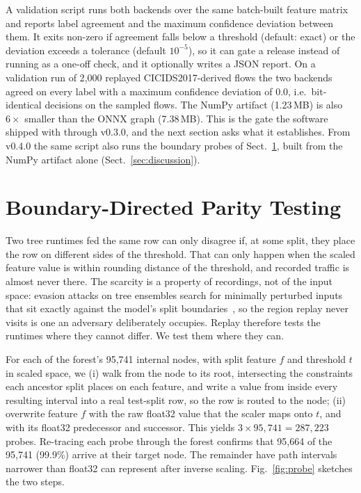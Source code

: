 \documentclass[runningheads]{llncs}
\begin{document}
A validation script runs both backends over the same batch-built feature matrix and reports label agreement and the maximum confidence deviation between them. It exits non-zero if agreement falls below a threshold (default: exact) or the deviation exceeds a tolerance (default $10^{-5}$), so it can gate a release instead of running as a one-off check, and it optionally writes a JSON report. On a validation run of 2{,}000 replayed CICIDS2017-derived flows the two backends agreed on every label with a maximum confidence deviation of 0.0, i.e.\ bit-identical decisions on the sampled flows. The NumPy artifact (1.23\,MB) is also $6\times$ smaller than the ONNX graph (7.38\,MB). This is the gate the software shipped with through v0.3.0, and the next section asks what it establishes. From v0.4.0 the same script also runs the boundary probes of Sect.~\ref{sec:boundary}, built from the NumPy artifact alone (Sect.~\ref{sec:discussion}).

\section{Boundary-Directed Parity Testing}
\label{sec:boundary}

Two tree runtimes fed the same row can only disagree if, at some split, they place the row on different sides of the threshold. That can only happen when the scaled feature value is within rounding distance of the threshold, and recorded traffic is almost never there. The scarcity is a property of recordings, not of the input space: evasion attacks on tree ensembles search for minimally perturbed inputs that sit exactly against the model's split boundaries~\cite{kantchelian2016evasion}, so the region replay never visits is one an adversary deliberately occupies. Replay therefore tests the runtimes where they cannot differ. We test them where they can.

For each of the forest's 95{,}741 internal nodes, with split feature $f$ and threshold $t$ in scaled space, we (i) walk from the node to its root, intersecting the constraints each ancestor split places on each feature, and write a value from inside every resulting interval into a real test-split row, so the row is routed to the node; (ii) overwrite feature $f$ with the raw float32 value that the scaler maps onto $t$, and with its float32 predecessor and successor. This yields $3 \times 95{,}741 = 287{,}223$ probes. Re-tracing each probe through the forest confirms that 95{,}664 of the 95{,}741 (99.9\%) arrive at their target node. The remainder have path intervals narrower than float32 can represent after inverse scaling. Fig.~\ref{fig:probe} sketches the two steps.
\end{document}
